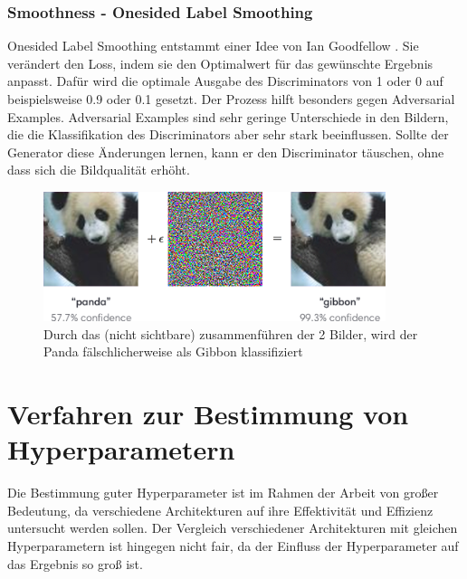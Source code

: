 
\subsubsection{Smoothness - Onesided Label Smoothing}
Onesided Label Smoothing entstammt einer Idee von Ian Goodfellow \cite{ian-goodfellow-onesided-label-smoothing}.
Sie verändert den Loss, indem sie den Optimalwert für das gewünschte Ergebnis anpasst.
Dafür wird die optimale Ausgabe des Discriminators von 1 oder 0 auf beispielsweise 0.9 oder 0.1 gesetzt.
Der Prozess hilft besonders gegen Adversarial Examples.
Adversarial Examples sind sehr geringe Unterschiede in den Bildern, die die Klassifikation des Discriminators aber sehr stark beeinflussen.
Sollte der Generator diese Änderungen lernen, kann er den Discriminator täuschen, ohne dass sich die Bildqualität erhöht.

\begin{figure}[H]
	\centering
	\includegraphics[width=10cm]{kapitel/2_stand_der_technik/img/adversrial-example.png}
	\caption[Adversarial Example]{Durch das (nicht sichtbare) zusammenführen der 2 Bilder, wird der Panda fälschlicherweise als Gibbon klassifiziert}
	\label{smoothness-adversarial-example}
\end{figure}



\section{Verfahren zur Bestimmung von Hyperparametern}
\label{chapter:verfahren-bestimmung-hyperparameter}

Die Bestimmung guter Hyperparameter ist im Rahmen der Arbeit von großer Bedeutung, da verschiedene Architekturen auf ihre Effektivität und Effizienz untersucht werden sollen.
Der Vergleich verschiedener Architekturen mit gleichen Hyperparametern ist hingegen nicht fair, da der Einfluss der Hyperparameter auf das Ergebnis so groß ist.
\newline

